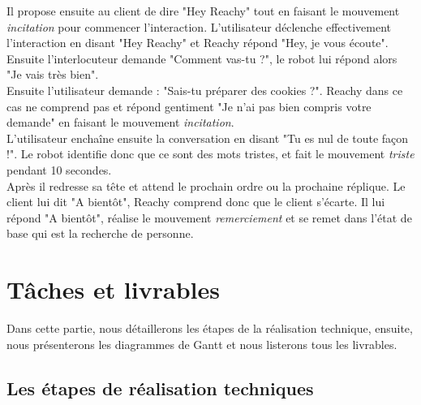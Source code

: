 Il propose ensuite au client de dire "Hey Reachy" tout en faisant le mouvement \textit{incitation} pour commencer l'interaction. L'utilisateur déclenche effectivement l'interaction en disant "Hey Reachy" et Reachy répond "Hey, je vous écoute". Ensuite l'interlocuteur demande "Comment vas-tu ?", le robot lui répond alors "Je vais très bien". \\

Ensuite l'utilisateur demande : "Sais-tu préparer des cookies ?". Reachy dans ce cas ne comprend pas et répond gentiment "Je n'ai pas bien compris votre demande" en faisant le mouvement \textit{incitation}. \\

L'utilisateur enchaîne ensuite la conversation en disant "Tu es nul de toute façon !". Le robot identifie donc que ce sont des mots tristes, et fait le mouvement \textit{triste} pendant 10 secondes. \\

Après il redresse sa tête et attend le prochain ordre ou la prochaine réplique. Le client lui dit "A bientôt", Reachy comprend donc que le client s'écarte. Il lui répond "A bientôt", réalise le mouvement \textit{remerciement} et se remet dans l'état de base qui est la recherche de personne.

\newpage

\section{Tâches et livrables}
Dans cette partie, nous détaillerons les étapes de la réalisation technique, ensuite, nous présenterons les diagrammes de Gantt et nous listerons tous les livrables.
\subsection{Les étapes de réalisation techniques}
